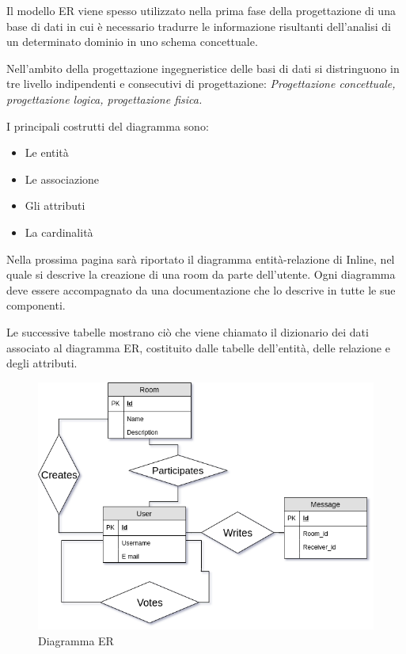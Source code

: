 Il modello ER viene spesso utilizzato nella prima fase della progettazione di una base di dati in cui è necessario tradurre le informazione risultanti dell'analisi di un determinato dominio in uno schema concettuale.

Nell'ambito della progettazione ingegneristice delle basi di dati si distringuono in tre livello indipendenti e consecutivi di progettazione: \textit{Progettazione concettuale, progettazione logica, progettazione fisica.}

I principali costrutti del diagramma sono:
\begin{itemize}
	\item Le entità
	\item Le associazione
	\item Gli attributi
	\item La cardinalità
\end{itemize}

Nella prossima pagina sarà riportato il diagramma entità-relazione di Inline, nel quale si descrive la creazione di una room da parte dell'utente.
Ogni diagramma deve essere accompagnato da una documentazione che lo descrive in tutte le sue componenti. 

Le successive tabelle mostrano ciò che viene chiamato il dizionario dei dati associato al diagramma ER, costituito dalle tabelle dell'entità, delle relazione e degli attributi.

\begin{figure}[H]
	\includegraphics[width=\columnwidth]{./media/ER.png}
	\caption{Diagramma ER}
\end{figure}

